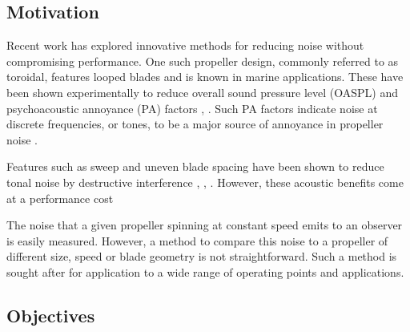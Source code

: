 \documentclass[12pt,a4paper]{article}
\begin{document}
\subsection{Motivation}

Recent work has explored innovative methods for reducing noise without compromising performance.
One such propeller design, commonly referred to as toroidal, features looped blades and is known in marine applications.
These have been shown experimentally to reduce overall sound pressure level (OASPL) and psychoacoustic annoyance (PA) factors \cite{shima_toroidal}, \cite{ijerph20031955}.
Such PA factors indicate noise at discrete frequencies, or tones, to be a major source of annoyance in propeller noise \cite{ijerph20031955}. %

Features such as sweep and uneven blade spacing have been shown to reduce tonal noise by destructive interference \cite{hanson_influence}, \cite{DOBRZYNSKI1993123}, \cite{doi:10.2514/3.22938} \cite{Wiedemann_swept}.
However, these acoustic benefits come at a performance cost 

The noise that a given propeller spinning at constant speed emits to an observer is easily measured.
However, a method to compare this noise to a propeller of different size, speed or blade geometry is not straightforward.
Such a method is sought after for application to a wide range of operating points and applications.





\subsection{Objectives}
\end{document}
